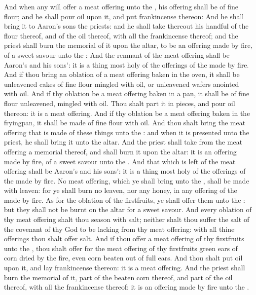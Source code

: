 \begin{biblechapter} %
 And when any will offer a meat offering unto the \LORD, his offering shall be of fine flour; and he shall pour oil upon it, and put frankincense thereon:
\verse And he shall bring it to Aaron's sons the priests: and he shall take thereout his handful of the flour thereof, and of the oil thereof, with all the frankincense thereof; and the priest shall burn the memorial of it upon the altar, to be an offering made by fire, of a sweet savour unto the \LORD:
\verse And the remnant of the meat offering shall be Aaron's and his sons': it is a thing most holy of the offerings of the \LORD made by fire.
\verse And if thou bring an oblation of a meat offering baken in the oven, it shall be unleavened cakes of fine flour mingled with oil, or unleavened wafers anointed with oil.
\verse And if thy oblation be a meat offering baken in a pan, it shall be of fine flour unleavened, mingled with oil.
\verse Thou shalt part it in pieces, and pour oil thereon: it is a meat offering.
\verse And if thy oblation be a meat offering baken in the fryingpan, it shall be made of fine flour with oil.
\verse And thou shalt bring the meat offering that is made of these things unto the \LORD: and when it is presented unto the priest, he shall bring it unto the altar.
\verse And the priest shall take from the meat offering a memorial thereof, and shall burn it upon the altar: it is an offering made by fire, of a sweet savour unto the \LORD.
\verse And that which is left of the meat offering shall be Aaron's and his sons': it is a thing most holy of the offerings of the \LORD made by fire.
\verse No meat offering, which ye shall bring unto the \LORD, shall be made with leaven: for ye shall burn no leaven, nor any honey, in any offering of the \LORD made by fire.
\verse As for the oblation of the firstfruits, ye shall offer them unto the \LORD: but they shall not be burnt on the altar for a sweet savour.
\verse And every oblation of thy meat offering shalt thou season with salt; neither shalt thou suffer the salt of the covenant of thy God to be lacking from thy meat offering: with all thine offerings thou shalt offer salt.
\verse And if thou offer a meat offering of thy firstfruits unto the \LORD, thou shalt offer for the meat offering of thy firstfruits green ears of corn dried by the fire, even corn beaten out of full ears.
\verse And thou shalt put oil upon it, and lay frankincense thereon: it is a meat offering.
\verse And the priest shall burn the memorial of it, part of the beaten corn thereof, and part of the oil thereof, with all the frankincense thereof: it is an offering made by fire unto the \LORD.
\end{biblechapter}


